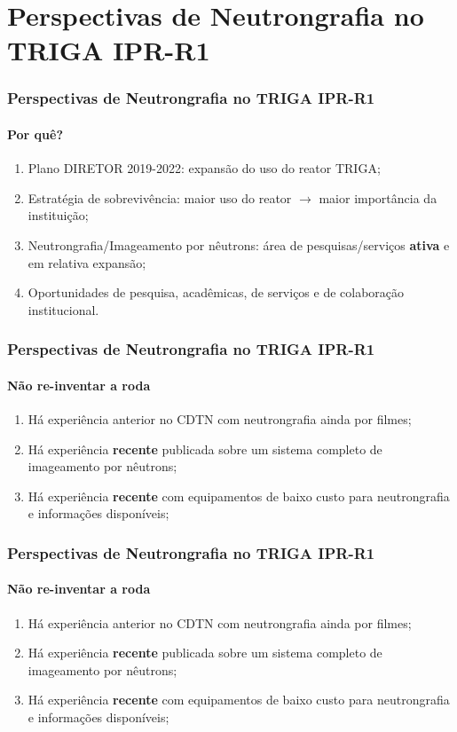 \documentclass[svgnames,smaller,table]{beamer}
\begin{document}
\section{Perspectivas de Neutrongrafia no TRIGA IPR-R1}
\begin{frame}
  \frametitle{Perspectivas de Neutrongrafia no TRIGA IPR-R1}
  \framesubtitle{Por quê?}
  \begin{enumerate}
  \item Plano DIRETOR 2019-2022: expansão do uso do reator TRIGA;
  \item Estratégia de sobrevivência: maior uso do reator $\rightarrow$ maior importância da instituição;
  \item Neutrongrafia/Imageamento por nêutrons: área de pesquisas/serviços \textbf{ativa} e em relativa expansão;%
  \item Oportunidades de pesquisa, acadêmicas, de serviços e de colaboração institucional.
  \end{enumerate}
\end{frame}

\begin{frame}
  \frametitle{Perspectivas de Neutrongrafia no TRIGA IPR-R1}
  \framesubtitle{Não re-inventar a roda}
  \begin{enumerate}
  \item Há experiência anterior no CDTN com neutrongrafia ainda por filmes\cite{Antonella2002,Antonella2003};
  \item Há experiência \textbf{recente} publicada sobre um sistema completo de imageamento por nêutrons\cite{Wilson2017}; %
  \item Há experiência \textbf{recente} com equipamentos de baixo custo para neutrongrafia e informações disponíveis\cite{Schillinger2019,Turkoglu2013};
    \end{enumerate}
\end{frame}

\begin{frame}
  \frametitle{Perspectivas de Neutrongrafia no TRIGA IPR-R1}
  \framesubtitle{Não re-inventar a roda}
  \begin{enumerate}
  \item Há experiência anterior no CDTN com neutrongrafia ainda por filmes\cite{Antonella2002,Antonella2003};
  \item Há experiência \textbf{recente} publicada sobre um sistema completo de imageamento por nêutrons\cite{Wilson2017}; %
  \item Há experiência \textbf{recente} com equipamentos de baixo custo para neutrongrafia e informações disponíveis\cite{Schillinger2019,Turkoglu2013};
    \end{enumerate}
\end{frame}
\end{document}
